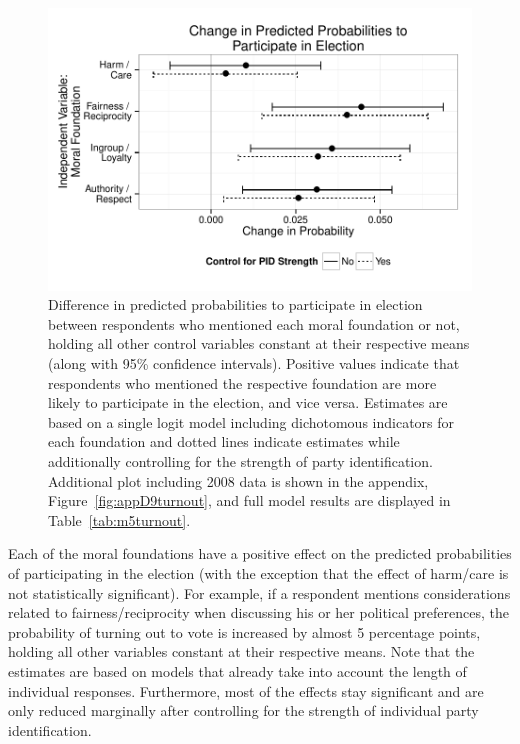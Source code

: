 \documentclass[12pt]{article}
\begin{document}
\begin{figure}[h]\centering
\includegraphics[scale=.9]{../calc/fig/fig5turnout.pdf}
\caption{Difference in predicted probabilities to participate in election between respondents who mentioned each moral foundation or not, holding all other control variables constant at their respective means (along with 95\% confidence intervals). Positive values indicate that respondents who mentioned the respective foundation are more likely to participate in the election, and vice versa. Estimates are based on a single logit model including dichotomous indicators for each foundation and dotted lines indicate estimates while additionally controlling for the strength of party identification. Additional plot including 2008 data is shown in the appendix, Figure~\ref{fig:appD9turnout}, and full model results are displayed in Table~\ref{tab:m5turnout}.}\label{fig:5turnout}
\end{figure}

Each of the moral foundations have a positive effect on the predicted probabilities of participating in the election (with the exception that the effect of harm/care is not statistically significant). For example, if a respondent mentions considerations related to fairness/reciprocity when discussing his or her political preferences, the probability of turning out to vote is increased by almost 5 percentage points, holding all other variables constant at their respective means. Note that the estimates are based on models that already take into account the length of individual responses. Furthermore, most of the effects stay significant and are only reduced marginally after controlling for the strength of individual party identification.
\end{document}
